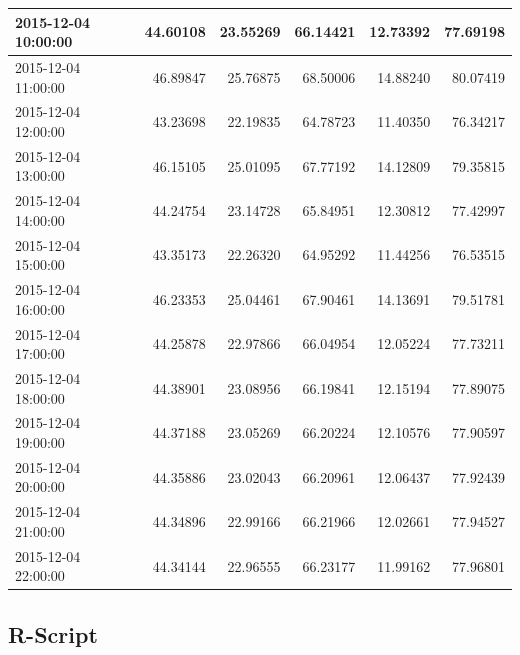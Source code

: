 \documentclass[openany]{book}
\begin{document}
\begin{table}[H]
\begin{tabular}{l|r|r|r|r|r}
\hline
2015-12-04 10:00:00 & 44.60108 & 23.55269 & 66.14421 & 12.73392 & 77.69198\\
\hline
\rowcolor{gray!6}  2015-12-04 11:00:00 & 46.89847 & 25.76875 & 68.50006 & 14.88240 & 80.07419\\
\hline
2015-12-04 12:00:00 & 43.23698 & 22.19835 & 64.78723 & 11.40350 & 76.34217\\
\hline
\rowcolor{gray!6}  2015-12-04 13:00:00 & 46.15105 & 25.01095 & 67.77192 & 14.12809 & 79.35815\\
\hline
2015-12-04 14:00:00 & 44.24754 & 23.14728 & 65.84951 & 12.30812 & 77.42997\\
\hline
\rowcolor{gray!6}  2015-12-04 15:00:00 & 43.35173 & 22.26320 & 64.95292 & 11.44256 & 76.53515\\
\hline
2015-12-04 16:00:00 & 46.23353 & 25.04461 & 67.90461 & 14.13691 & 79.51781\\
\hline
\rowcolor{gray!6}  2015-12-04 17:00:00 & 44.25878 & 22.97866 & 66.04954 & 12.05224 & 77.73211\\
\hline
2015-12-04 18:00:00 & 44.38901 & 23.08956 & 66.19841 & 12.15194 & 77.89075\\
\hline
\rowcolor{gray!6}  2015-12-04 19:00:00 & 44.37188 & 23.05269 & 66.20224 & 12.10576 & 77.90597\\
\hline
2015-12-04 20:00:00 & 44.35886 & 23.02043 & 66.20961 & 12.06437 & 77.92439\\
\hline
\rowcolor{gray!6}  2015-12-04 21:00:00 & 44.34896 & 22.99166 & 66.21966 & 12.02661 & 77.94527\\
\hline
2015-12-04 22:00:00 & 44.34144 & 22.96555 & 66.23177 & 11.99162 & 77.96801\\
\hline
\end{tabular}
\end{table}

\newpage

\hypertarget{script-c}{%
\subsection*{R-Script}\label{script-c}}
\end{document}
